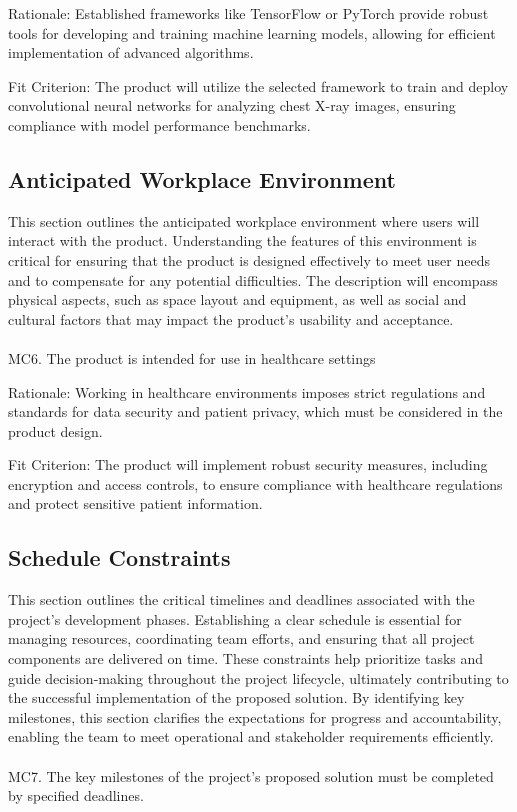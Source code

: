 \documentclass[12pt]{article}
\begin{document}
Rationale: Established frameworks like TensorFlow or PyTorch provide robust tools for developing 
and training machine learning models, allowing for efficient implementation of advanced algorithms.

Fit Criterion: The product will utilize the selected framework to train and deploy convolutional 
neural networks for analyzing chest X-ray images, ensuring compliance with model performance 
benchmarks.


\subsection{Anticipated Workplace Environment}
This section outlines the anticipated workplace environment where users will interact with the 
product. Understanding the features of this environment is critical for ensuring that the product 
is designed effectively to meet user needs and to compensate for any potential difficulties. The 
description will encompass physical aspects, such as space layout and equipment, as well as social 
and cultural factors that may impact the product's usability and acceptance.
\\\\
\noindent
MC6. The product is intended for use in healthcare settings

Rationale: Working in healthcare environments imposes strict regulations and standards for data 
security and patient privacy, which must be considered in the product design.

Fit Criterion: The product will implement robust security measures, including encryption and 
access controls, to ensure compliance with healthcare regulations and protect sensitive patient 
information.


\subsection{Schedule Constraints}
This section outlines the critical timelines and deadlines associated with the project’s 
development phases. Establishing a clear schedule is essential for managing resources, 
coordinating team efforts, and ensuring that all project components are delivered on time. These 
constraints help prioritize tasks and guide decision-making throughout the project lifecycle, 
ultimately contributing to the successful implementation of the proposed solution. By identifying 
key milestones, this section clarifies the expectations for progress and accountability, enabling 
the team to meet operational and stakeholder requirements efficiently.
\\\\
\noindent
MC7. The key milestones of the project’s proposed solution must be completed by specified 
deadlines.
\end{document}
